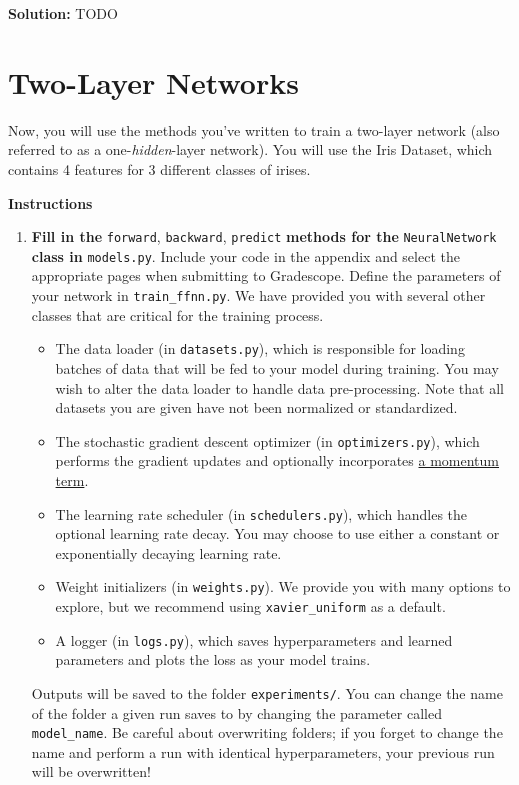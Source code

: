 \documentclass{article}
\newcommand{\Question}[1]{\Large \section{ #1 } \normalsize}
\newenvironment{solution}{\color{blue} \smallskip \textbf{Solution:}}{}
\begin{document}
\begin{solution}
    TODO
\end{solution}

\newpage
\Question{Two-Layer Networks}
Now, you will use the methods you've written to train a two-layer network (also referred to as a one-\emph{hidden}-layer network). 
You will use the Iris Dataset, which contains 4 features for 3 different classes of irises.

\textbf{Instructions}
\begin{enumerate}
    \item 
    \textbf{Fill in the} \texttt{forward}, \texttt{backward}, \texttt{predict} \textbf{methods for the} \texttt{NeuralNetwork} \textbf{class in} \texttt{models.py}. 
    Include your code in the appendix and select the appropriate pages when submitting to Gradescope. 
    Define the parameters of your network in \texttt{train\_ffnn.py}. 
    We have provided you with several other classes that are critical for the training process.
    \begin{itemize}
        \item 
        The data loader (in \texttt{datasets.py}), which is responsible for loading batches of data that will be fed to your model during training. 
        You may wish to alter the data loader to handle data pre-processing. 
        Note that all datasets you are given have not been normalized or standardized.
        \item 
        The stochastic gradient descent optimizer (in \texttt{optimizers.py}), which performs the gradient updates and optionally incorporates \href{https://machinelearningmastery.com/learning-rate-for-deep-learning-neural-networks/}{a momentum term}.
        \item The learning rate scheduler (in \texttt{schedulers.py}), which handles the optional learning rate decay. 
        You may choose to use either a constant or exponentially decaying learning rate. 
        \item 
        Weight initializers (in \texttt{weights.py}). 
        We provide you with many options to explore, but we recommend using \texttt{xavier\_uniform} as a default.
        \item 
        A logger (in \texttt{logs.py}), which saves hyperparameters and learned parameters and plots the loss as your model trains.
    \end{itemize}
    Outputs will be saved to the folder \texttt{experiments/}. 
    You can change the name of the folder a given run saves to by changing the parameter called \texttt{model\_name}. 
    Be careful about overwriting folders; if you forget to change the name and perform a run with identical hyperparameters, your previous run will be overwritten!


\end{enumerate}
\end{document}
